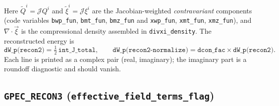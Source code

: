 \documentclass[10pt,a4paper]{article}
\numberwithin{equation}{section}
\begin{document}
Here $\tilde Q^i=\mathcal JQ^i$ and $\tilde\xi^i=\mathcal J\xi^i$ are the
Jacobian-weighted \emph{contravariant} components (code variables
\texttt{bwp\_fun}, \texttt{bmt\_fun}, \texttt{bmz\_fun} and
\texttt{xwp\_fun}, \texttt{xmt\_fun}, \texttt{xmz\_fun}), and
$\nabla\!\cdot\!\vec\xi$ is the compressional density assembled in
\texttt{divxi\_density}.  The reconstructed energy is
\begin{equation}
\texttt{dW\_p(recon2)}=\tfrac12\,\texttt{int\_J\_total},
\qquad
\texttt{dW\_p(recon2-normalize)}=\texttt{dcon\_fac}\times\texttt{dW\_p(recon2)} .
\end{equation}
Each line is printed as a complex pair (real, imaginary); the imaginary part
is a roundoff diagnostic and should vanish.

\subsection{\texttt{GPEC\_RECON3} (\texttt{effective\_field\_terms\_flag})}
\end{document}
